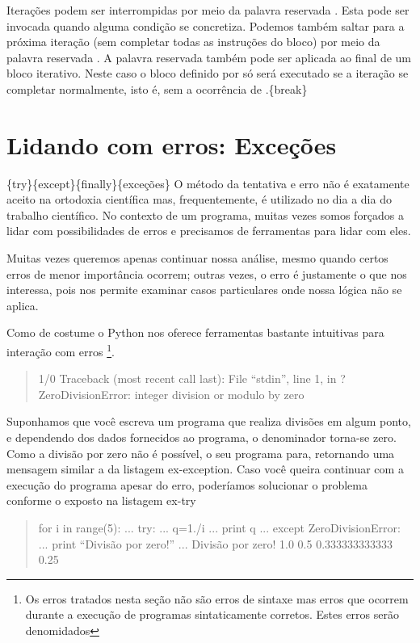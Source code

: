 \documentclass[a4paper,10pt,brazil]{sphinxmanual}
\begin{document}
Iterações podem ser interrompidas por meio da palavra reservada
. Esta pode ser invocada quando alguma condição se
concretiza. Podemos também saltar para a próxima iteração (sem
completar todas as instruções do bloco) por meio da palavra
reservada . A palavra reservada  também pode
ser aplicada ao final de um bloco iterativo. Neste caso o bloco
definido por  só será executado se a iteração se completar
normalmente, isto é, sem a ocorrência de .\{break\}


\section{Lidando com erros: Exceções}
\label{Cap2:lidando-com-erros-excecoes}
\{try\}\{except\}\{finally\}\{exceções\} O método da tentativa e erro não é
exatamente aceito na ortodoxia científica mas, frequentemente, é
utilizado no dia a dia do trabalho científico. No contexto de um
programa, muitas vezes somos forçados a lidar com possibilidades de
erros e precisamos de ferramentas para lidar com eles.

Muitas vezes queremos apenas continuar nossa análise, mesmo quando
certos erros de menor importância ocorrem; outras vezes, o erro é
justamente o que nos interessa, pois nos permite examinar casos
particulares onde nossa lógica não se aplica.

Como de costume o Python nos oferece ferramentas bastante
intuitivas para interação com erros \footnote{
Os erros tratados nesta seção não são erros de sintaxe mas erros
que ocorrem durante a execução de programas sintaticamente
corretos. Estes erros serão denomidados 
}.
\begin{quote}

1/0 Traceback (most recent call last): File ``stdin'', line 1, in ?
ZeroDivisionError: integer division or modulo by zero
\end{quote}

Suponhamos que você escreva um programa que realiza divisões em
algum ponto, e dependendo dos dados fornecidos ao programa, o
denominador torna-se zero. Como a divisão por zero não é possível,
o seu programa para, retornando uma mensagem similar a da listagem
ex-exception. Caso você queira continuar com a execução do programa
apesar do erro, poderíamos solucionar o problema conforme o exposto
na listagem ex-try
\begin{quote}

for i in range(5): ... try: ... q=1./i ... print q ... except
ZeroDivisionError: ... print ``Divisão por zero!'' ... Divisão por
zero! 1.0 0.5 0.333333333333 0.25
\end{quote}
\end{document}
